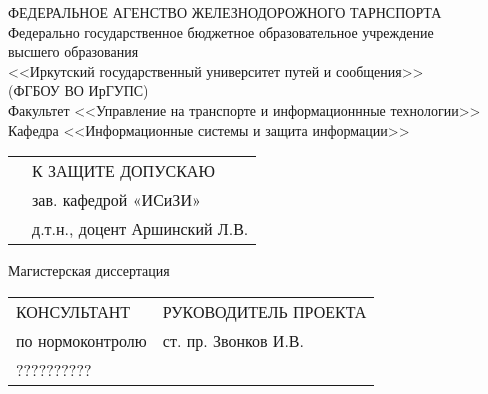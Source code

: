 \begin{titlepage}
	\changefontsizes[14pt]{14pt}
	\newpage
	\begin{center}
		ФЕДЕРАЛЬНОЕ АГЕНСТВО ЖЕЛЕЗНОДОРОЖНОГО ТАРНСПОРТА \\
		\vspace{14pt}
		Федерально государственное бюджетное образовательное учреждение \\ высшего образования \\
		<<Иркутский государственный университет путей и сообщения>> \\
		(ФГБОУ ВО ИрГУПС) \\
		\vspace{21pt}
		Факультет <<Управление на транспорте и информационнные технологии>> \\
		Кафедра <<Информационные системы и защита информации>>
	\end{center}
	\vspace{28pt}
	\begin{flushleft}
		\begin{tabular}{p{}l}
								&  К ЗАЩИТЕ ДОПУСКАЮ				\\
								&  	зав. кафедрой «ИСиЗИ»			\\
								&  	д.т.н., доцент Аршинский Л.В.	\\
		\end{tabular}
	\end{flushleft}
	\vspace{28pt}
	\begin{center}
		\MakeUppercase{\kurtitle}
	\end{center}
	\vspace{-7pt}
	\begin{center}
		Магистерская диссертация \\
	\vspace{14pt}
		\mytitle
	\end{center}
	\vspace{49pt}
	\begin{flushleft}
		\begin{tabular}{p{0.47\textwidth}l}
			КОНСУЛЬТАНТ			&  РУКОВОДИТЕЛЬ ПРОЕКТА		\\
			по нормоконтролю	&  ст. пр. Звонков И.В.		\\
			??????????			&  							\\
		\end{tabular}
	\end{flushleft}
	\vspace{49pt}
	\begin{flushleft}

\end{flushleft}
\end{titlepage}
